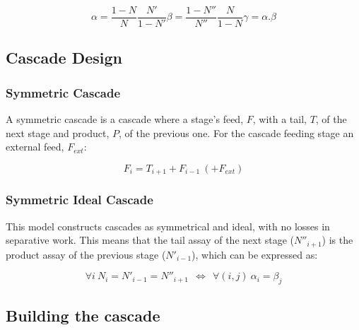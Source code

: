 \begin{subequations}
    \label{eq_alphabeta}
    \begin{equation} \label{eq_alpha_def}
        \alpha = \frac{1-N}{N}\frac{N'}{1-N'}
    \end{equation}
    \begin{equation}\label{eq_beta-def}
        \beta = \frac{1-N''}{N''}\frac{N}{1-N}
    \end{equation}
    \begin{equation}\label{eq_gamma-def}
        \gamma = \alpha.\beta
    \end{equation}
\end{subequations}


\subsection{Cascade Design}
\subsubsection{Symmetric Cascade}

A symmetric cascade is a cascade where a stage's feed, $F$, with a tail, $T$, of the next
stage and product, $P$, of the previous one. For the cascade feeding stage
an external feed, $F_{ext}$:

\begin{equation}
    F_{i} = T_{i+1} + F_{i-1} ~(+ F_{ext})
\end{equation}

\subsubsection{Symmetric Ideal Cascade}
This model constructs cascades as symmetrical and ideal, with no losses in
separative work. This means that the tail assay of the next stage ($N''_{i+1}$)
is the product assay of the previous stage ($N'_{i-1}$), which can be
expressed as:

\begin{equation}
    \forall i~ N_{i} = N'_{i-1} = N''_{i+1}~ ~\Leftrightarrow~ ~\forall (i,j)~
    \alpha_{i} = \beta_{j}
\end{equation}



\subsection{Building the cascade}

